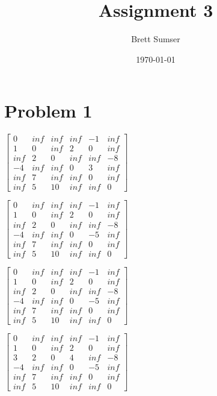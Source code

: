 \documentclass{article}
\title{Assignment 3}
\author{Brett Sumser}
\date\today
\begin{document}
\maketitle %


\section*{Problem 1}

$ \begin{bmatrix}
0   & inf & inf & inf & -1  & inf \\
1   & 0   & inf & 2   & 0   & inf \\
inf & 2   & 0   & inf & inf & -8  \\
-4  & inf & inf & 0   & 3   & inf \\
inf & 7   & inf & inf & 0   & inf \\
inf & 5   & 10  & inf & inf & 0
\end{bmatrix}  $


$ \begin{bmatrix}
0   & inf & inf & inf & -1  & inf       \\
1   & 0   & inf & 2   & 0   & inf \\
inf & 2   & 0   & inf & inf & -8  \\
-4  & inf & inf & 0   & -5  & inf \\
inf & 7   & inf & inf & 0   & inf \\
inf & 5   & 10  & inf & inf & 0
\end{bmatrix}  $

$ \begin{bmatrix}
0   & inf & inf & inf & -1  & inf       \\
1   & 0   & inf & 2   & 0   & inf \\
inf & 2   & 0   & inf & inf & -8  \\
-4  & inf & inf & 0   & -5  & inf \\
inf & 7   & inf & inf & 0   & inf \\
inf & 5   & 10  & inf & inf & 0
\end{bmatrix}  $

$ \begin{bmatrix}
0   & inf & inf & inf & -1  & inf       \\
1   & 0   & inf & 2   & 0   & inf \\
3   & 2   & 0   & 4   & inf & -8  \\
-4  & inf & inf & 0   & -5  & inf \\
inf & 7   & inf & inf & 0   & inf \\
inf & 5   & 10  & inf & inf & 0
\end{bmatrix}  $
\end{document}
